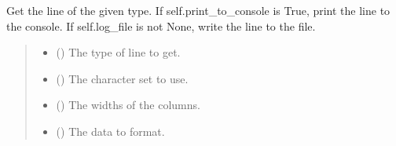 \documentclass[letterpaper,10pt,english]{sphinxmanual}
\begin{document}
\begin{fulllineitems}
\begin{fulllineitems}
\label{\detokenize{nodes:nodes.nodePrinter.tablePrinter.get_line}}
\pysigstartsignatures
\pysiglinewithargsret
{}
{\sphinxparamcomma {}\sphinxparamcomma {}\sphinxparamcomma {}}
{}
\pysigstopsignatures
\sphinxAtStartPar
Get the line of the given type.
If self.print\_to\_console is True, print the line to the console.
If self.log\_file is not None, write the line to the file.
\begin{quote}\begin{description}
\begin{itemize}
\item {} 
\sphinxAtStartPar
{} ({\hyperref[\detokenize{nodes:nodes.nodePrinter.lineTypes}]{}}) \textendash{} The type of line to get.

\item {} 
\sphinxAtStartPar
{} () \textendash{} The character set to use.

\item {} 
\sphinxAtStartPar
{} () \textendash{} The widths of the columns.

\item {} 
\sphinxAtStartPar
{} () \textendash{} The data to format.

\end{itemize}

\end{description}\end{quote}

\end{fulllineitems}



\end{fulllineitems}
\end{document}
